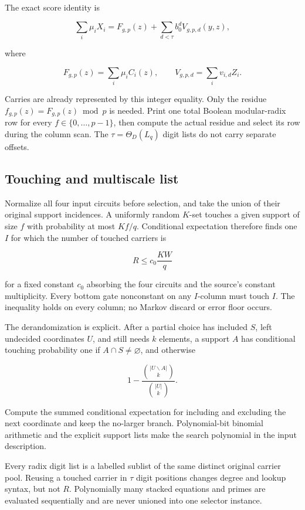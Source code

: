 \documentclass[11pt,letterpaper]{article}
\theoremstyle{definition}
\theoremstyle{remark}
\begin{document}
The exact score identity is

\[
\sum_i\mu_iX_i
{}={}
F_{g,p}(z)+\sum_{d<\tau}b_0^dV_{g,p,d}(y,z),
\]

where

\[
F_{g,p}(z)=\sum_i\mu_iC_i(z),
\qquad
V_{g,p,d}=\sum_iv_{i,d}Z_i.
\]

Carries are already represented by this integer equality. Only the
residue \(f_{g,p}(z)=F_{g,p}(z)\bmod p\) is needed. Print one total
Boolean modular-radix row for every \(f\in\{0,\ldots,p-1\}\), then
compute the actual residue and select its row during the column scan.
The \(\tau=\Theta_D(L_q)\) digit lists do not carry separate offsets.

\subsection{Touching and multiscale
list}\label{a4-touching-and-multiscale-list}

Normalize all four input circuits before selection, and take the union
of their original support incidences. A uniformly random \(K\)-set
touches a given support of size \(f\) with probability at most \(Kf/q\).
Conditional expectation therefore finds one \(I\) for which the number
of touched carriers is

\[
R\le c_0\frac{KW}{q}
\]

for a fixed constant \(c_0\) absorbing the four circuits and the
source's constant multiplicity. Every bottom gate
nonconstant on any \(I\)-column must touch \(I\). The inequality holds
on every column; no Markov discard or error floor occurs.

The derandomization is explicit. After a partial choice has included
\(S\), left undecided coordinates \(U\), and still needs \(k\) elements,
a support \(A\) has conditional touching probability one if
\(A\cap S\ne\varnothing\), and otherwise

\[
1-
\frac{\binom{|U\smallsetminus A|}{k}}
{\binom{|U|}{k}}.
\]

Compute the summed conditional expectation for including and excluding
the next coordinate and keep the no-larger branch. Polynomial-bit
binomial arithmetic and the explicit support lists make the search
polynomial in the input description.

Every radix digit list is a labelled sublist of the same distinct
original carrier pool. Reusing a touched carrier in \(\tau\) digit
positions changes degree and lookup syntax, but not \(R\). Polynomially
many stacked equations and primes are evaluated sequentially and are
never unioned into one selector instance.
\end{document}
